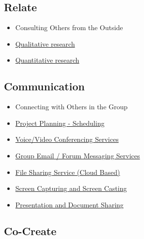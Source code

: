 \subsection{Relate}

\begin{itemize}
\item
  Consulting Others from the Outside
\end{itemize}
\begin{itemize}
\item
  \href{http://peeragogy.org/qualitative-research/}{Qualitative
  research}
\item
  \href{http://peeragogy.org/quantitative-research/}{Quantitative
  research}
\end{itemize}
\subsection{Communication}

\begin{itemize}
\item
  Connecting with Others in the Group
\end{itemize}
\begin{itemize}
\item
  \href{http://peeragogy.org/planning-and-scheduling/}{Project Planning
  - Scheduling}
\item
  \href{http://peeragogy.org/voice-and-video-conferencing/}{Voice/Video
  Conferencing Services}
\item
  \href{http://peeragogy.org/group-communication/}{Group Email / Forum
  Messaging Services}
\item
  \href{http://peeragogy.org/file-sharing/}{File Sharing Service (Cloud
  Based)}
\item
  \href{http://peeragogy.org/screen-capture/}{Screen Capturing and
  Screen Casting}
\item
  \href{http://peeragogy.org/presentation-and-document-sharing/}{Presentation
  and Document Sharing}
\end{itemize}
\subsection{Co-Create}

